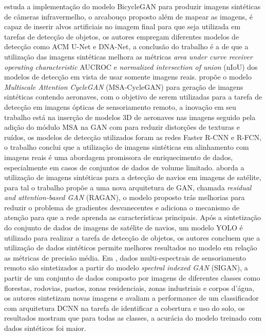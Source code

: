  estuda a implementação do modelo BicycleGAN para produzir imagens sintéticas de câmeras infravermelho, o arcabouço proposto além de mapear as imagens, é capaz de inserir alvos artificiais no imagem final para que seja utilizada em tarefas de detecção de objetos, os autores empregam diferentes modelos de detecção como ACM U-Net e DNA-Net, a conclusão do trabalho é a de que a utilização das imagens sintéticas melhora as métricas \textit{area under curve receiver operating characteristic} AUCROC e \textit{normalized intersection of union} (nIoU) dos modelos de detecção em vista de usar somente imagens reais.
 propõe o modelo \textit{Multiscale Attention CycleGAN} (MSA-CycleGAN) para geração de imagens sintéticas contendo aeronaves, com o objetivo de serem utilizadas para a tarefa de detecção em imagens ópticas de sensoriamento remoto, a inovação em seu trabalho está na inserção de modelos 3D de aeronaves nas imagens seguido pela adição do módulo MSA na GAN com para reduzir distorções de texturas e ruídos, os modelos de detecção utilizados foram as redes Faster R-CNN e R-FCN, o trabalho conclui que a utilização de imagens sintéticas em alinhamento com imagens reais é uma abordagem promissora de enriquecimento de dados, especialmente em casos de conjuntos de dados de volume limitado.
 aborda a utilização de imagens sintéticas para a detecção de navios em imagens de satélite, para tal o trabalho propõe a uma nova arquitetura de GAN, chamada \textit{residual and attention-based GAN} (RAGAN), o modelo proposto trás melhorias para reduzir o problema de gradientes desvanecentes e adiciona o mecanismo de atenção para que a rede aprenda as características principais. Após a sintetização do conjunto de dados de imagens de satélite de navios, um modelo YOLO é utilizado para realizar a tarefa de detecção de objetos, os autores concluem que a utilização de dados sintéticos permite melhores resultados no modelo em relação as métricas de precisão média.
Em , dados multi-espectrais de sensoriamento remoto são sintetizados a partir do modelo \textit{spectral indexed GAN} (SIGAN), a partir de um conjunto de dados composto por imagens de diferentes classes como florestas, rodovias, pastos, zonas residenciais, zonas industriais e corpos d'água, os autores sintetizam novas imagens e avaliam a performance de um classificador com arquitetura DCNN na tarefa de identificar a cobertura e uso do solo, os resultados mostram que para todas as classes, a acurácia do modelo treinado com dados sintéticos foi maior.
